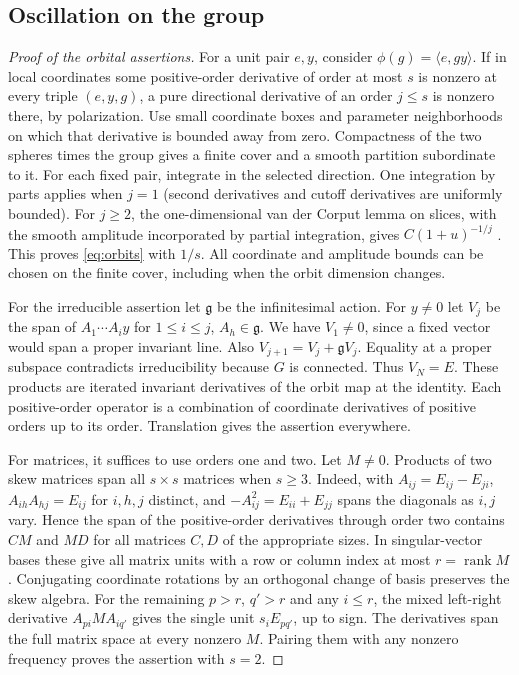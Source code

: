 \documentclass[10pt,letterpaper]{article}
\newcommand{\ip}[2]{\langle #1,#2\rangle}
\begin{document}
\subsection{Oscillation on the group}
\begin{proof}[Proof of the orbital assertions]
For a unit pair $e,y$, consider $\phi(g)=\ip e{gy}$. If in local coordinates some positive-order derivative of order at most $s$ is nonzero at every triple $(e,y,g)$, a pure directional derivative of an order $j\le s$ is nonzero there, by polarization. Use small coordinate boxes and parameter neighborhoods on which that derivative is bounded away from zero. Compactness of the two spheres times the group gives a finite cover and a smooth partition subordinate to it. For each fixed pair, integrate in the selected direction. One integration by parts applies when $j=1$ (second derivatives and cutoff derivatives are uniformly bounded). For $j\ge2$, the one-dimensional van der Corput lemma on slices, with the smooth amplitude incorporated by partial integration, gives $C(1+u)^{-1/j}$ \cite[Lemma 1.1]{ccw}. This proves \eqref{eq:orbits} with $1/s$. All coordinate and amplitude bounds can be chosen on the finite cover, including when the orbit dimension changes.

For the irreducible assertion let $\mathfrak g$ be the infinitesimal action. For $y\ne0$ let $V_j$ be the span of $A_1\cdots A_i y$ for $1\le i\le j$, $A_h\in\mathfrak g$. We have $V_1\ne0$, since a fixed vector would span a proper invariant line. Also $V_{j+1}=V_j+\mathfrak gV_j$. Equality at a proper subspace contradicts irreducibility because $G$ is connected. Thus $V_N=E$. These products are iterated invariant derivatives of the orbit map at the identity. Each positive-order operator is a combination of coordinate derivatives of positive orders up to its order. Translation gives the assertion everywhere.

For matrices, it suffices to use orders one and two. Let $M\ne0$. Products of two skew matrices span all $s\times s$ matrices when $s\ge3$. Indeed, with $A_{ij}=E_{ij}-E_{ji}$, $A_{ih}A_{hj}=E_{ij}$ for $i,h,j$ distinct, and $-A_{ij}^2=E_{ii}+E_{jj}$ spans the diagonals as $i,j$ vary. Hence the span of the positive-order derivatives through order two contains $CM$ and $MD$ for all matrices $C,D$ of the appropriate sizes. In singular-vector bases these give all matrix units with a row or column index at most $r=\operatorname{rank}M$. Conjugating coordinate rotations by an orthogonal change of basis preserves the skew algebra. For the remaining $p>r$, $q'>r$ and any $i\le r$, the mixed left-right derivative $A_{pi}M A_{iq'}$ gives the single unit $s_i E_{pq'}$, up to sign. The derivatives span the full matrix space at every nonzero $M$. Pairing them with any nonzero frequency proves the assertion with $s=2$.
\end{proof}
\end{document}
